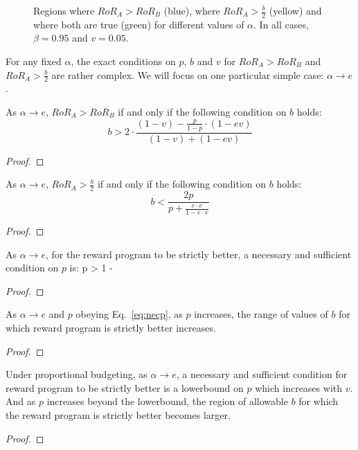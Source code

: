 \begin{figure}[t!]
\caption{{Regions where $RoR_A > RoR_B$ (blue), where $RoR_A > \frac{b}{2}$ (yellow) and where both are true (green) for different values of $\alpha$. In all cases, $\beta = 0.95$ and $v = 0.05$.}}
\label{fig:offer_reward_or_not}
\end{figure}

For any fixed $\alpha$, the exact conditions on $p$, $b$ and $v$ for $RoR_A > RoR_B$ and $RoR_A > \frac{b}{2}$ are rather complex. We will focus on one particular simple case: $\alpha \rightarrow e$. 

\begin{lemma}
As $\alpha \rightarrow e$, $RoR_A > RoR_B$ if and only if the following condition on $b$ holds:
\begin{equation}
b > 2\cdot \frac{(1-v) - \frac{p}{1-p}\cdot (1-ev)}{(1-v) + (1-ev)}
\end{equation}
\end{lemma} 
\begin{proof}
\end{proof}

\begin{lemma}
As $\alpha \rightarrow e$, $RoR_A > \frac{b}{2}$ if and only if the following condition on $b$ holds:
\begin{equation}
b < \frac{2p}{p+\frac{e\cdot v}{1-e\cdot v}}
\end{equation}
\end{lemma} 

\begin{proof}

\end{proof}

\begin{lemma}
As $\alpha \rightarrow e$, for the reward program to be strictly better, a necessary and sufficient condition on $p$ is:
\beq
\label{eq:necp}
p > 1 - 
\eeq
\end{lemma}
\begin{proof}
\end{proof}

\begin{lemma}
As $\alpha \rightarrow e$ and $p$ obeying Eq.~\ref{eq:necp}, as $p$ increases, the range of values of $b$ for which reward program is strictly better increases.
\end{lemma}
\begin{proof}
\end{proof}

\begin{theorem}
Under proportional budgeting, as $\alpha\rightarrow e$, a necessary and sufficient condition for reward program to be strictly better is a lowerbound on $p$ which increases with $v$.  
And as $p$ increases beyond the lowerbound, the region of allowable $b$ for which the reward program is strictly better becomes larger. 
\end{theorem}
\begin{proof}
\end{proof}

